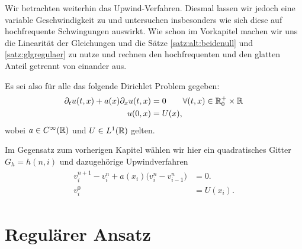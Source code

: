 
Wir betrachten weiterhin das Upwind-Verfahren. Diesmal lassen wir jedoch eine
variable Geschwindigkeit zu und untersuchen insbesonders wie sich diese auf
hochfrequente Schwingungen auswirkt. Wie schon im Vorkapitel machen wir uns die
Linearität der Gleichungen und die Sätze \ref{satz:alt:beidenull} und
\ref{satz:glgregulaer} zu nutze und rechnen den hochfrequenten und den glatten
Anteil getrennt von einander aus.

Es sei also für alle das folgende Dirichlet Problem gegeben:
\begin{align}\label{eq:varadv:pde}
\begin{split}
\partial_t u(t, x) + a(x) \partial_x u(t, x) &= 0 \qquad \forall (t, x) \in \mathbb R^+_0 \times \mathbb R\\
u(0, x) &= U(x),
\end{split}
\end{align}
wobei $a \in C^\infty(\mathbb R)$ und $U \in L^1(\mathbb R)$ gelten.

Im Gegensatz zum vorherigen Kapitel wählen wir hier ein quadratisches Gitter $G_h = h (n, i)$ und dazugehörige
Upwindverfahren
\begin{align}\label{eq:varadv:verfahren}
\begin{split}
v^{n+1}_i - v^n_i + a(x_i) \bigl( v^n_i - v^n_{i-1} \bigr) &= 0.\\
v^0_i &= U(x_i).
\end{split}
\end{align}

\section{Regulärer Ansatz}

